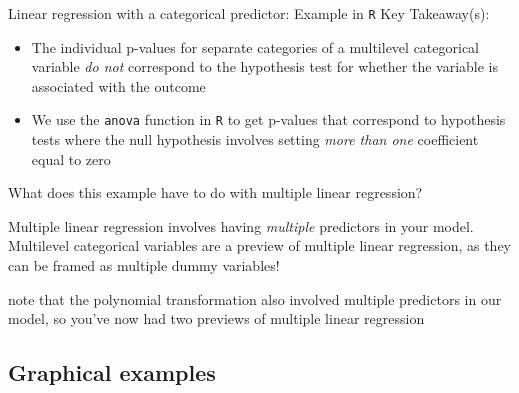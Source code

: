 \documentclass[10pt,t]{beamer}
\begin{document}
\begin{frame}{Linear regression with a categorical predictor: Example in \texttt{R}}
Key Takeaway(s):
\vspace{0.3cm}

\begin{itemize}
	\item The individual p-values for separate categories of a multilevel categorical variable \textit{do not} correspond to the hypothesis test for whether the variable is associated with the outcome
	\item We use the \texttt{anova} function in \texttt{R} to get p-values that correspond to hypothesis tests where the null hypothesis involves setting \textit{more than one} coefficient equal to zero
\end{itemize} \pause

\vspace{0.3cm}

What does this example have to do with multiple linear regression? 

\vspace{0.3cm}

Multiple linear regression involves having \textit{multiple} predictors in your model. Multilevel categorical variables are a preview of multiple linear regression, as they can be framed as multiple dummy variables! \pause

\vspace{0.2cm}

\tiny *note that the polynomial transformation also involved multiple predictors in our model, so you've now had two previews of multiple linear regression

\end{frame}

\subsection{Graphical examples}
\end{document}
